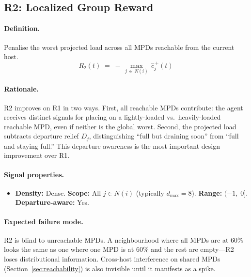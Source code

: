 \documentclass[11pt]{article}
\begin{document}
\subsection{R2: Localized Group Reward}
\label{sec:r2}

\paragraph{Definition.}
Penalise the worst projected load across all MPDs reachable from the
current host.
\begin{equation}
\boxed{
  R_2(t)
  \;=\;
  -\,\max_{j \,\in\, N(i)}\, \hat{c}_j^{\,+}(t)
}
\label{eq:r2}
\end{equation}

\paragraph{Rationale.}
R2 improves on R1 in two ways.  First, all reachable MPDs contribute: the
agent receives distinct signals for placing on a lightly-loaded vs.\
heavily-loaded reachable MPD, even if neither is the global worst.  Second,
the projected load subtracts departure relief $D_j$, distinguishing ``full
but draining soon'' from ``full and staying full.''  This departure
awareness is the most important design improvement over R1.

\paragraph{Signal properties.}
\begin{itemize}
  \item \textbf{Density:} Dense. \quad \textbf{Scope:} All $j \in N(i)$
        (typically $d_{\max} = 8$). \quad \textbf{Range:} $(-1,\; 0]$.
        \quad \textbf{Departure-aware:} Yes.
\end{itemize}

\paragraph{Expected failure mode.}
R2 is blind to unreachable MPDs.  A neighbourhood where all MPDs are at
60\% looks the same as one where one MPD is at 60\% and the rest are
empty---R2 loses distributional information.  Cross-host interference on
shared MPDs (Section~\ref{sec:reachability}) is also invisible until it
manifests as a spike.
\end{document}
